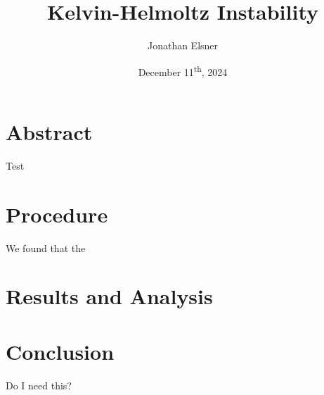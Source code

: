 \documentclass{article}
\title{Kelvin-Helmoltz Instability}
\author{Jonathan Elsner}
\date{December 11\textsuperscript{th}, 2024}
\begin{document}
\maketitle

\section{Abstract}

Test \cite{kh-instability-demo}

\section{Procedure}

We found that the 

\section{Results and Analysis}

\section{Conclusion}

Do I need this?

{}

\end{document}
